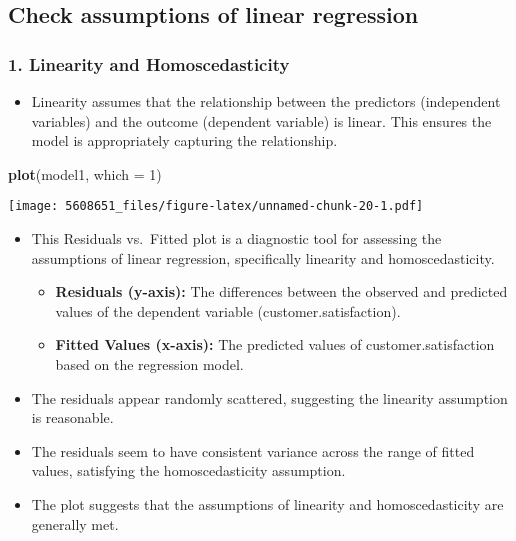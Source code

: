 \documentclass[
]{article}
\newenvironment{Shaded}{\begin{snugshade}}{\end{snugshade}}
\newcommand{\AttributeTok}[1]{\textcolor[rgb]{0.13,0.29,0.53}{#1}}
\newcommand{\DecValTok}[1]{\textcolor[rgb]{0.00,0.00,0.81}{#1}}
\newcommand{\FunctionTok}[1]{\textcolor[rgb]{0.13,0.29,0.53}{\textbf{#1}}}
\newcommand{\NormalTok}[1]{#1}
\providecommand{\tightlist}{%
  \setlength{\itemsep}{0pt}\setlength{\parskip}{0pt}}
\begin{document}
\subsection{Check assumptions of linear
regression}\label{check-assumptions-of-linear-regression}

\subsubsection{1. Linearity and
Homoscedasticity}\label{linearity-and-homoscedasticity}

\begin{itemize}
\tightlist
\item
  Linearity assumes that the relationship between the predictors
  (independent variables) and the outcome (dependent variable) is
  linear. This ensures the model is appropriately capturing the
  relationship.
\end{itemize}

\begin{Shaded}
\begin{Highlighting}[]
\FunctionTok{plot}\NormalTok{(model1, }\AttributeTok{which =} \DecValTok{1}\NormalTok{)}
\end{Highlighting}
\end{Shaded}

\texttt{[image: 5608651\_files/figure-latex/unnamed-chunk-20-1.pdf]}

\begin{itemize}
\tightlist
\item
  This Residuals vs.~Fitted plot is a diagnostic tool for assessing the
  assumptions of linear regression, specifically linearity and
  homoscedasticity.

  \begin{itemize}
  \tightlist
  \item
    \textbf{Residuals (y-axis):} The differences between the observed
    and predicted values of the dependent variable
    (customer.satisfaction).
  \item
    \textbf{Fitted Values (x-axis):} The predicted values of
    customer.satisfaction based on the regression model.
  \end{itemize}
\item
  The residuals appear randomly scattered, suggesting the linearity
  assumption is reasonable.
\item
  The residuals seem to have consistent variance across the range of
  fitted values, satisfying the homoscedasticity assumption.
\item
  The plot suggests that the assumptions of linearity and
  homoscedasticity are generally met.
\end{itemize}
\end{document}
